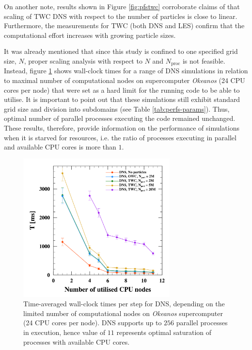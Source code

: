 \documentclass{pracamgren}
\begin{document}
On another note, results shown in Figure \ref{fig:pfstwc} corroborate claims of \textcite{Rosa2022} that scaling of TWC DNS with respect to the number of particles is close to linear.
Furthermore, the measurements for TWC (both DNS and LES) confirm that the computational effort increases with growing particle sizes.

\medskip

It was already mentioned that since this study is confined to one specified grid size, $N$, proper scaling analysis with respect to $N$ and $N_\text{proc}$ is not feasible.
Instead, figure \ref{fig:pfspfn} shows wall-clock times for a range of DNS simulations in relation to maximal number of computational nodes on supercomputer \emph{Okeanos} (24 CPU cores per node) that were set as a hard limit for the running code to be able to utilise.
It is important to point out that these simulations still exhibit standard grid size and division into subdomains (see Table \ref{tab:perfs-params}).
Thus, optimal number of parallel processes executing the code remained unchanged.
These results, therefore, provide information on the performance of simulations when it is starved for resources, i.e. the ratio of processes executing in parallel and available CPU cores is more than $1$.

\begin{figure}[h]
\centering
\includegraphics[width=8cm]{figures/3-04_pfspfn.pdf}
\caption{
Time-averaged wall-clock times per step for DNS, depending on the limited number of computational nodes on \emph{Okeanos} supercomputer (24 CPU cores per node).
DNS supports up to $256$ parallel processes in execution, hence value of $11$ represents optimal saturation of processes with available CPU cores.
}
\label{fig:pfspfn}
\end{figure}
\end{document}
